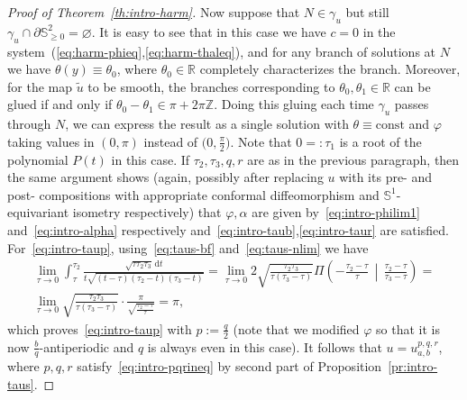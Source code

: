 \documentclass{amsart}
\let\ge\geqslant
\let\emptyset\varnothing
\let\phi\varphi
\renewcommand{\d}{\mathrm{d}}
\newcommand{\bigmid}{\,\middle\vert\,}
\newcommand{\const}{\mathrm{const}}
\theoremstyle{plain}
\theoremstyle{definition}
\theoremstyle{remark}
\begin{document}
\begin{proof}[Proof of Theorem~\ref{th:intro-harm}]
Now suppose that \(N\in\gamma_u\) but still \(\gamma_u\cap\partial\mathbb S_{\ge
0}^2=\emptyset\). It is easy to see that in this case we have \(c=0\) in the
system~(\ref{eq:harm-phieq},\ref{eq:harm-thaleq}), and for any branch of
solutions at \(N\) we have \(\theta(y)\equiv\theta_0\), where
\(\theta_0\in\mathbb R\) completely characterizes the branch. Moreover, for the
map \(\tilde u\) to be smooth, the branches corresponding to
\(\theta_0,\theta_1\in\mathbb R\) can be glued if and only if
\(\theta_0-\theta_1\in\pi+2\pi\mathbb Z\). Doing this gluing each time
\(\gamma_u\) passes through \(N\), we can express the result as a single
solution with \(\theta\equiv\const\) and \(\phi\) taking values in \((0,\pi)\)
instead of \(\bigl(0,\frac{\pi}2\bigr)\). Note that \(0=:\tau_1\) is a root of
the polynomial \(P(t)\) in this case. If \(\tau_2,\tau_3,q,r\) are as in the
previous paragraph, then the same argument shows (again, possibly after
replacing \(u\) with its pre- and post- compositions with appropriate conformal
diffeomorphism and \(\mathbb S^1\)-equivariant isometry respectively) that
\(\phi,\alpha\) are given by~\eqref{eq:intro-philim1} and~\eqref{eq:intro-alpha}
respectively and~\eqref{eq:intro-taub},\eqref{eq:intro-taur} are satisfied.
For~\eqref{eq:intro-taup}, using~\eqref{eq:taus-bf} and~\eqref{eq:taus-nlim} we
have
\begin{multline}\label{eq:harm-limint}
\lim_{\tau\to 0}\int_\tau^{\tau_2}
\frac{\sqrt{\tau\tau_2\tau_3}\,\d t}{t\sqrt{(t-\tau)(\tau_2-t)(\tau_3-t)}}=
\lim_{\tau\to 0}2\sqrt{\frac{\tau_2\tau_3}{\tau(\tau_3-\tau)}}
\Pi\left(-\frac{\tau_2-\tau}\tau\bigmid
\frac{\tau_2-\tau}{\tau_3-\tau}\right)=\\
\lim_{\tau\to 0}\sqrt{\frac{\tau_2\tau_3}{\tau(\tau_3-\tau)}}\cdot
\frac{\pi}{\sqrt{\frac{\tau_2-\tau}\tau}}=\pi,
\end{multline}
which proves~\eqref{eq:intro-taup} with \(p:=\frac{q}2\) (note that we modified
\(\phi\) so that it is now \(\frac{b}q\)-antiperiodic and \(q\) is always even
in this case). It follows that \(u=u_{a,b}^{p,q,r}\), where \(p,q,r\)
satisfy~\eqref{eq:intro-pqrineq} by second part of
Proposition~\ref{pr:intro-taus}.


\end{proof}
\end{document}
